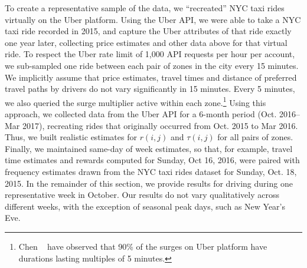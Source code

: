 To create a representative sample of the data, we ``recreated'' NYC taxi rides virtually on the Uber platform. 
Using the Uber API, we were able to take a NYC taxi ride recorded in 2015, and capture the Uber attributes of that ride exactly 
one year later, collecting price estimates and other data above for that virtual ride.
To respect the Uber rate limit of 1,000 API requests per hour per account, we sub-sampled one ride between each pair of zones in
the city every 15 minutes.
We implicitly assume that price estimates, travel times and distance of preferred travel paths by drivers do not vary 
significantly in 15 minutes. Every 5 minutes, we also queried the surge multiplier active within each zone.\footnote{Chen {\etal}~\cite{chen2015peeking} have observed that 90\% of the surges on Uber platform 
have durations lasting multiples of 5 minutes.} 
Using this approach, we collected data from the Uber API for a 6-month period (Oct. 2016--Mar 2017), 
recreating rides that originally occurred from 
Oct. 2015 to Mar 2016.   Thus, we built realistic estimates for $r(i,j)$ and $\tau(i,j)$
for all pairs of zones.  Finally, we maintained same-day of week estimates, so that, for example, travel time estimates
and rewards computed for Sunday, Oct 16, 2016, were paired with frequency estimates drawn from the NYC taxi rides dataset for
Sunday, Oct. 18, 2015.
In the remainder of this section, we provide  results for driving during one representative week in October.
Our results do not vary qualitatively across different weeks, with the exception of seasonal peak days, such as New Year's Eve. 

%

